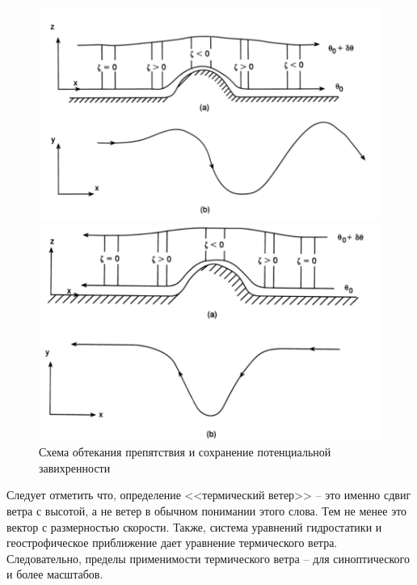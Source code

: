     \begin{figure}
    \begin{minipage}[b]{.52\textwidth} %
        \centering
        \includegraphics[width=1\linewidth]{pics/ch12.31.png}
        \end{minipage}%
    \begin{minipage}[b]{.48\textwidth} %
      \centering
      \includegraphics[width=1\linewidth]{pics/ch12.32.png}
    \end{minipage}
    \caption{\label{fig:ch12.3} {\color{red}Схема обтекания препятствия и сохранение потенциальной завихренности}}
    \end{figure}



Следует отметить что, определение <<термический ветер>> -- это именно сдвиг ветра с высотой, а не ветер в обычном понимании этого слова. Тем не менее это вектор с размерностью скорости. Также, система уравнений гидростатики и геострофическое приближение дает уравнение термического ветра. Следовательно, пределы применимости термического ветра -- для синоптического и более масштабов.
